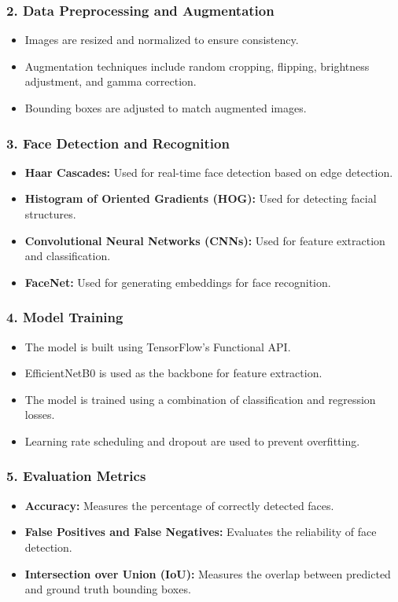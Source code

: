 \documentclass[a4paper]{feidipsp}
\begin{document}
\subsubsection{2. Data Preprocessing and Augmentation}
\begin{itemize}
    \item Images are resized and normalized to ensure consistency.
    \item Augmentation techniques include random cropping, flipping, brightness adjustment, and gamma correction.
    \item Bounding boxes are adjusted to match augmented images.
\end{itemize}

\subsubsection{3. Face Detection and Recognition}
\begin{itemize}
    \item \textbf{Haar Cascades:} Used for real-time face detection based on edge detection.
    \item \textbf{Histogram of Oriented Gradients (HOG):} Used for detecting facial structures.
    \item \textbf{Convolutional Neural Networks (CNNs):} Used for feature extraction and classification.
    \item \textbf{FaceNet:} Used for generating embeddings for face recognition.
\end{itemize}

\subsubsection{4. Model Training}
\begin{itemize}
    \item The model is built using TensorFlow's Functional API.
    \item EfficientNetB0 is used as the backbone for feature extraction.
    \item The model is trained using a combination of classification and regression losses.
    \item Learning rate scheduling and dropout are used to prevent overfitting.
\end{itemize}

\subsubsection{5. Evaluation Metrics}
\begin{itemize}
    \item \textbf{Accuracy:} Measures the percentage of correctly detected faces.
    \item \textbf{False Positives and False Negatives:} Evaluates the reliability of face detection.
    \item \textbf{Intersection over Union (IoU):} Measures the overlap between predicted and ground truth bounding boxes.
\end{itemize}
\end{document}
